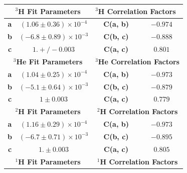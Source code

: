 \documentclass[final,5p,times,twocolumn]{elsarticle}
\begin{document}
\begin{table}[!h]
\begin{tabular}{|c|c|l|c|c|l|}
\hline
\multicolumn{3}{|c|}{\textbf{$^{3}$H Fit Parameters}}                                & \multicolumn{3}{l|}{\textbf{$^{3}$H Correlation Factors}}    \\ \hline
\textbf{a}              & \multicolumn{2}{c|}{$(1.06 \pm 0.36) \times 10^{-4}$}                & \textbf{C(a, b)}             & \multicolumn{2}{c|}{$-0.974$} \\ \hline
\textbf{b}              & \multicolumn{2}{c|}{$(-6.8 \pm 0.89) \times 10^{-3}$}                 & \textbf{C(b, c)}             & \multicolumn{2}{c|}{$-0.888$} \\ \hline
\textbf{c}              & \multicolumn{2}{c|}{$1. +/- 0.003$}                        & \textbf{C(a, c)}             & \multicolumn{2}{c|}{$0.801$}  \\ \hline
\multicolumn{3}{|c|}{\textbf{$^{3}$He Fit Parameters}}                               & \multicolumn{3}{c|}{\textbf{$^{3}$He Correlation Factors}}   \\ \hline
\textbf{a}              & \multicolumn{2}{c|}{$(1.04 \pm 0.25) \times 10^{-4}$}                 & \textbf{C(a, b)}                      & \multicolumn{2}{c|}{$-0.973$} \\ \hline
\textbf{b}              & \multicolumn{2}{c|}{$(-5.1 \pm 0.64) \times 10^{-3}$}                 & \textbf{C(b, c)}                      & \multicolumn{2}{c|}{$-0.879$} \\ \hline
\textbf{c}              & \multicolumn{2}{c|}{$1 \pm 0.003$}                         & \textbf{C(a, c)}                     & \multicolumn{2}{c|}{$0.779$}  \\ \hline
\multicolumn{3}{|c|}{\textbf{$^{2}$H Fit Parameters}}                                & \multicolumn{3}{c|}{\textbf{$^{2}$H Correlation Factors}}    \\ \hline
\textbf{a}              & \multicolumn{2}{c|}{$(1.16 \pm 0.29) \times 10^{-4}$} & \textbf{C(a, b)}             & \multicolumn{2}{c|}{$-0.973$} \\ \hline
\textbf{b}              & \multicolumn{2}{c|}{$(-6.7 \pm 0.71) \times 10^{-3}$}                 & \textbf{C(b, c)}             & \multicolumn{2}{c|}{$-0.895$} \\ \hline
\textbf{c}              & \multicolumn{2}{c|}{$1. \pm 0.003$}                        & \textbf{C(a, c)}             & \multicolumn{2}{c|}{$0.805$}  \\ \hline
\multicolumn{3}{|c|}{\textbf{$^{1}$H Fit Parameters}}                                & \multicolumn{3}{c|}{\textbf{$^{1}$H Correlation Factors}}    \\ \hline

\end{tabular}
\end{table}
\end{document}

